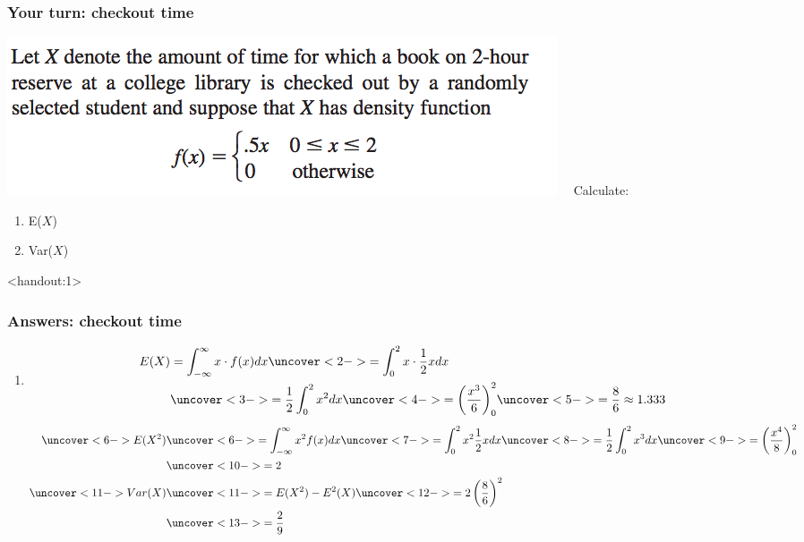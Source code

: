 \documentclass[handout]{beamer}\usepackage[]{graphicx}\usepackage[]{color}
\newcommand{\answers}{1}
\providecommand{\q}{$\quad$ \newline}
\numberwithin{equation}{section}
\begin{document}
\begin{frame}
\frametitle{Your turn: checkout time}
 \includegraphics{../../fig/checkoutpdf.png}\q
Calculate:
\begin{enumerate}
\item E($X$)
\item Var($X$)
\end{enumerate}
\end{frame}

\begin{frame}<handout:\answers>
\frametitle{Answers: checkout time} \small
\begin{enumerate}[1. ]
\item 
\begin{align*}
E(X) &= \int_{-\infty}^\infty x \cdot f(x) dx \uncover<2->{= \int_0^2 x \cdot \frac{1}{2} x dx} \\
&\uncover<3->{= \frac{1}{2} \int_0^2 x^2 dx} \uncover<4->{= \left ( \frac{x^3}{6}\right )_0^2} \uncover<5->{ = \frac{8}{6} \approx 1.333}
\end{align*}
\begin{align*}
\uncover<6->{E(X^2)} & \uncover<6->{= \int_{-\infty}^\infty x^2 f(x) dx} \uncover<7->{=\int_0^2 x^2 \frac{1}{2} x dx} \uncover<8->{ = \frac{1}{2} \int_{0}^2 x^3 dx} \uncover<9->{ = \left ( \frac{x^4}{8} \right )_0^2 } \\ 
&\uncover<10->{=2} \\
\uncover<11->{Var(X)} & \uncover<11->{= E(X^2) - E^2(X)} \uncover<12->{= 2 \left ( \frac{8}{6} \right ) ^2 } \\
& \uncover<13->{= \frac{2}{9}}
\end{align*}
\end{enumerate}
\end{frame}
\end{document}
